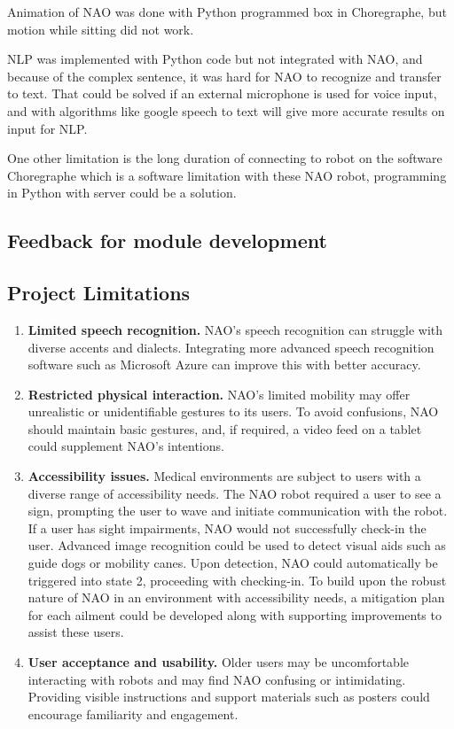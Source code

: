 \documentclass[conference]{IEEEtran}
\begin{document}
Animation of NAO was done with Python programmed box in Choregraphe, but motion while sitting did not work. 

NLP was implemented with Python code but not integrated with NAO, and because of the complex sentence, it was hard for NAO to recognize and transfer to text. That could be solved if an external microphone is used for voice input, and with algorithms like google speech to text will give more accurate results on input for NLP. 

One other limitation is the long duration of connecting to robot on the software Choregraphe which is a software limitation with these NAO robot, programming in Python with server could be a solution.
\subsection{Feedback for module development}


\subsection{Project Limitations}

\begin{enumerate} \item \textbf{Limited speech recognition.} NAO’s speech recognition can struggle with diverse accents and dialects. Integrating more advanced speech recognition software such as Microsoft Azure can improve this with better accuracy.
        \item \textbf{Restricted physical interaction.} NAO’s limited mobility may offer unrealistic or unidentifiable gestures to its users. To avoid confusions, NAO should maintain basic gestures, and, if required, a video feed on a tablet could supplement NAO’s intentions.
        \item \textbf{Accessibility issues.} Medical environments are subject to users with a diverse range of accessibility needs. The NAO robot required a user to see a sign, prompting the user to wave and initiate communication with the robot. If a user has sight impairments, NAO would not successfully check-in the user.  Advanced image recognition could be used to detect visual aids such as guide dogs or mobility canes. Upon detection, NAO could automatically be triggered into state 2, proceeding with checking-in. To build upon the robust nature of NAO in an environment with accessibility needs, a mitigation plan for each ailment could be developed along with supporting improvements to assist these users.
        \item \textbf{User acceptance and usability.} Older users may be uncomfortable interacting with robots and may find NAO confusing or intimidating. Providing visible instructions and support materials such as posters could encourage familiarity and engagement.
\end{enumerate}
\end{document}
